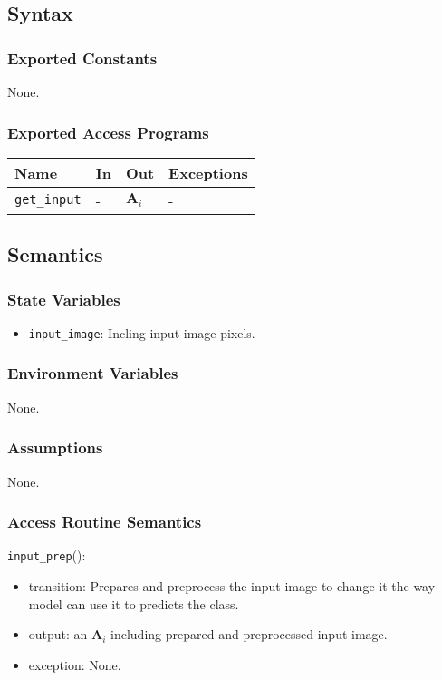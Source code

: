 \documentclass[12pt, titlepage]{article}
\def\code#1{\texttt{#1}}
\begin{document}
\subsection{Syntax}
\subsubsection{Exported Constants}
None.

\subsubsection{Exported Access Programs}

\begin{center}
\begin{tabular}{p{3.5cm} p{4cm} p{4cm} p{2cm}}
\hline
\textbf{Name} & \textbf{In} & \textbf{Out} & \textbf{Exceptions} \\
\hline
\code{get\_input} & - & $\mathbf{A}_{i}$ & - \\
\hline
\end{tabular}
\end{center}

\subsection{Semantics}

\subsubsection{State Variables}
\begin{itemize}
  \item \code{input\_image}: Incling input image pixels.
\end{itemize}

\subsubsection{Environment Variables}
None.

\subsubsection{Assumptions}
None.

\subsubsection{Access Routine Semantics}

\noindent \code{input\_prep}():
\begin{itemize}
  \item transition: Prepares and preprocess the input image to change it 
  the way model can use it to predicts the class.
  \item output: an $\mathbf{A}_{i}$ including prepared and preprocessed input image.
  \item exception: None.
\end{itemize}
\end{document}
